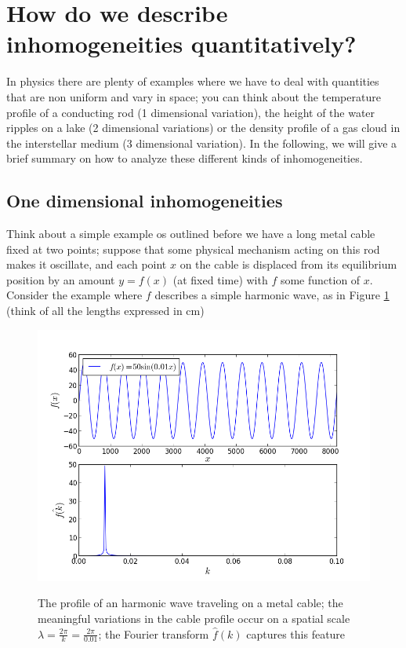 \documentclass[11pt, a4paper,oneside,openright]{book}
\numberwithin{equation}{section}
\begin{document}
\section{How do we describe inhomogeneities quantitatively?}
\label{fouriersection}
In physics there are plenty of examples where we have to deal with quantities that are non uniform and vary in space; you can think about the temperature profile of a conducting rod (1 dimensional variation), the height of the water ripples on a lake (2 dimensional variations) or the density profile of a gas cloud in the interstellar medium (3 dimensional variation). In the following, we will give a brief summary on how to analyze these different kinds of inhomogeneities. 
\subsection{One dimensional inhomogeneities}
Think about a simple example os outlined before we have a long metal cable fixed at two points; suppose that some physical mechanism acting on this rod makes it oscillate, and each point $x$ on the cable is displaced from its equilibrium position by an amount $y=f(x)$ (at fixed time) with $f$ some function of $x$. Consider the example where $f$ describes a simple harmonic wave, as in Figure \ref{fourier1d} (think of all the lengths expressed in cm)
\begin{figure}
\begin{center}
\includegraphics[scale=0.7]{Fourier/1component.png}
\label{}
\end{center}
\caption{The profile of an harmonic wave traveling on a metal cable; the meaningful variations in the cable profile occur on a spatial scale $\lambda=\frac{2\pi}{k}=\frac{2\pi}{0.01}$; the Fourier transform $\hat{f}(k)$ captures this feature}
\label{fourier1d}
\end{figure}
\end{document}
